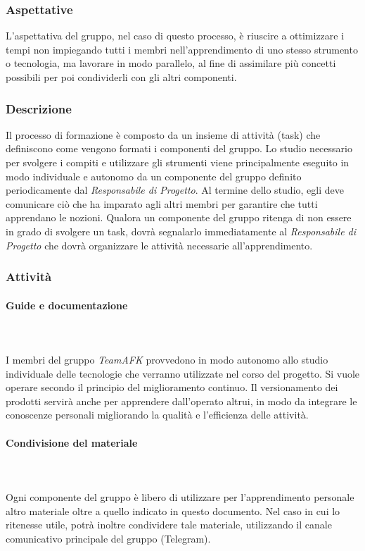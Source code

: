 \subsubsection{Aspettative}
L’aspettativa del gruppo, nel caso di questo processo, è riuscire a ottimizzare i tempi non impiegando tutti i membri nell’apprendimento di uno stesso strumento o tecnologia, ma lavorare in modo parallelo, al fine di assimilare più concetti possibili per poi condividerli con gli altri componenti.

\subsubsection{Descrizione}
Il processo di formazione è composto da un insieme di attività (task) che definiscono come vengono formati i componenti del gruppo. Lo studio necessario per svolgere i compiti e utilizzare gli strumenti viene principalmente eseguito in modo individuale e autonomo da un componente del gruppo definito periodicamente dal \textit{Responsabile di Progetto}. Al termine dello studio, egli deve comunicare ciò che ha imparato agli altri membri per garantire che tutti apprendano le nozioni. Qualora un componente del gruppo ritenga di non essere in grado di svolgere un task, dovrà segnalarlo immediatamente al \textit{Responsabile di Progetto} che dovrà organizzare le attività necessarie all'apprendimento.

\subsubsection{Attività}
\paragraph{Guide e documentazione}\mbox{} \\ \mbox{} \\
I membri del gruppo \textit{TeamAFK} provvedono in modo autonomo allo studio individuale delle tecnologie che verranno utilizzate nel corso del progetto. Si vuole operare secondo il principio del miglioramento continuo. Il versionamento dei prodotti servirà anche per apprendere dall'operato altrui, in modo da integrare le conoscenze personali migliorando la qualità e l'efficienza delle
attività.

\paragraph{Condivisione del materiale}\mbox{} \\ \mbox{} \\
Ogni componente del gruppo è libero di utilizzare per l'apprendimento personale altro materiale oltre a quello indicato in questo documento. Nel caso in cui lo ritenesse utile, potrà inoltre condividere tale materiale, utilizzando il canale comunicativo principale del gruppo (Telegram).